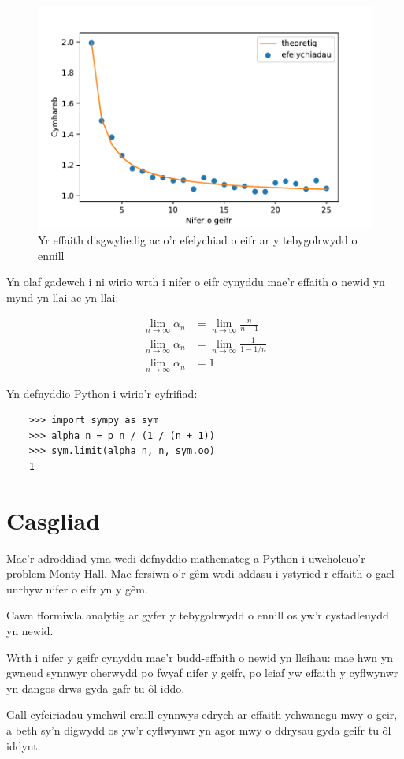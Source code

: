 \documentclass[a4paper]{article}
\begin{document}
\begin{figure}[!htbp]
    \begin{center}
        \includegraphics[width=.6\textwidth]{./simulated_v_expected_ratio_of_win_probability.pdf}
    \end{center}
    \caption{Yr effaith disgwyliedig ac o'r efelychiad o eifr ar y tebygolrwydd o ennill}
    \label{fig:simulated_v_expected_ratio_of_win_probability}
\end{figure}

Yn olaf gadewch i ni wirio wrth i nifer o eifr cynyddu mae'r effaith o newid yn
mynd yn llai ac yn llai:

\begin{multicols}{2}

    \begin{align}
        \lim_{n\to\infty}\alpha_n & = \lim_{n\to\infty}\frac{n}{n - 1}\\
        \lim_{n\to\infty}\alpha_n & = \lim_{n\to\infty}\frac{1}{1 - 1 / n}\\
        \lim_{n\to\infty}\alpha_n & = 1
    \end{align}

    \columnbreak

Yn defnyddio Python i wirio'r cyfrifiad:

    \begin{verbatim}
    >>> import sympy as sym
    >>> alpha_n = p_n / (1 / (n + 1))
    >>> sym.limit(alpha_n, n, sym.oo)
    1
    \end{verbatim}

\end{multicols}

\section{Casgliad}

Mae'r adroddiad yma wedi defnyddio mathemateg a Python i uwcholeuo'r problem
Monty Hall. Mae fersiwn o'r g\^{e}m wedi addasu i ystyried r effaith o gael
unrhyw nifer o eifr yn y g\^{e}m.

Cawn fformiwla analytig ar gyfer y tebygolrwydd o ennill os yw'r cystadleuydd yn
newid.

Wrth i nifer y geifr cynyddu mae'r budd-effaith o newid yn lleihau: mae hwn yn
gwneud synnwyr oherwydd po fwyaf nifer y geifr, po leiaf yw effaith y cyflwynwr
yn dangos drws gyda gafr tu \^{o}l iddo.

Gall cyfeiriadau ymchwil eraill cynnwys edrych ar effaith ychwanegu mwy o geir,
a beth sy'n digwydd os yw'r cyflwynwr yn agor mwy o ddrysau gyda geifr tu \^{o}l
iddynt.




\end{document}
